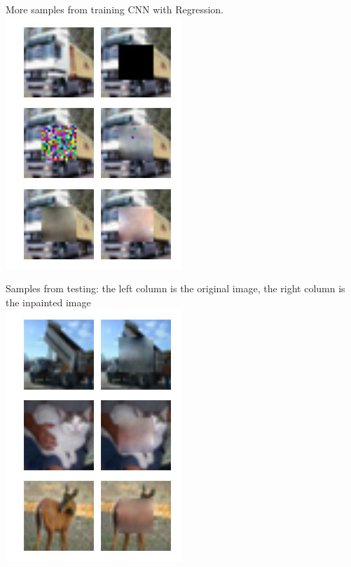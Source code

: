 \documentclass[10pt,twocolumn,letterpaper]{article}
\begin{document}
More samples from training CNN with Regression. \\
\includegraphics[width=0.8\linewidth]{baseline_train_truck.jpg} 

Samples from testing: the left column is the original image, the right column is the inpainted image \\
\includegraphics[width=0.8\linewidth]{baseline_test.jpg} 
\end{document}
